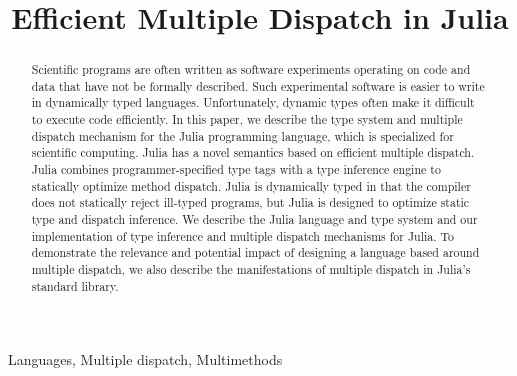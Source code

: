 \documentclass[pldi]{sigplanconf-pldi15}
\begin{document}
\lstset{basicstyle=\footnotesize\ttfamily,mathescape=true,basewidth=0.5em}



\title{Efficient Multiple Dispatch in Julia}


\maketitle

\begin{abstract}
Scientific programs are often written as software experiments operating on
code and data that have not be formally described. Such experimental software
is easier to write in dynamically typed languages. Unfortunately,
dynamic types often make it difficult to execute code efficiently. In this
paper, we describe the type system and multiple dispatch mechanism for the
Julia programming language, which is specialized for scientific computing. Julia has a
novel semantics based on efficient multiple dispatch. Julia combines
programmer-specified type tags with a type inference engine to statically
optimize method dispatch. Julia is dynamically typed in that the compiler does
not statically reject ill-typed programs, but Julia is designed to optimize
static type and dispatch inference. We describe the Julia language and type
system and our implementation of type inference and multiple dispatch
mechanisms for Julia. To demonstrate the relevance and potential impact of
designing a language based around multiple dispatch, we also describe the
manifestations of multiple dispatch in Julia's standard library.
\end{abstract}


\terms Languages, Multiple dispatch, Multimethods

\end{document}
